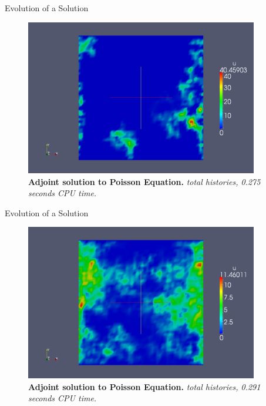 \documentclass{beamer}
\begin{document}
\begin{frame}{Evolution of a Solution}

  \begin{figure}[h!]
    \begin{center}
      \includegraphics[width=4in]{adjoint_100.png}
    \end{center}
    \caption{\textbf{Adjoint solution to Poisson Equation.}
      \textit{ total histories, 0.275 seconds CPU time.} }
  \end{figure}

\end{frame}

\begin{frame}{Evolution of a Solution}

  \begin{figure}[h!]
    \begin{center}
      \includegraphics[width=4in]{adjoint_1000.png}
    \end{center}
    \caption{\textbf{Adjoint solution to Poisson Equation.}
      \textit{ total histories, 0.291 seconds CPU time.} }
  \end{figure}

\end{frame}
\end{document}
